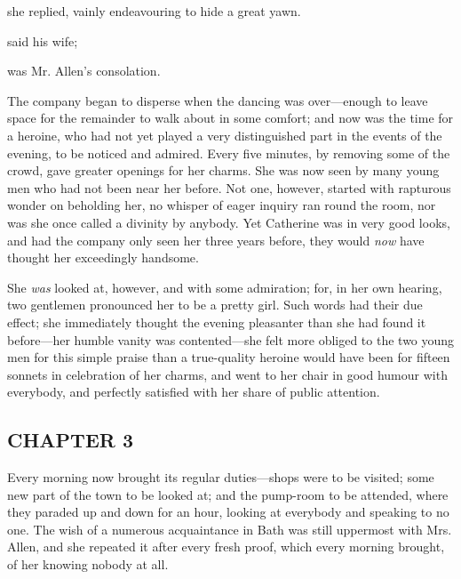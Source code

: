  she replied, vainly endeavouring to hide a great yawn.

 said his wife; 

 was Mr. Allen's consolation.

The company began to disperse when the dancing was over---enough to leave space for the remainder to walk about in some comfort; and now was the time for a heroine, who had not yet played a very distinguished part in the events of the evening, to be noticed and admired. Every five minutes, by removing some of the crowd, gave greater openings for her charms. She was now seen by many young men who had not been near her before. Not one, however, started with rapturous wonder on beholding her, no whisper of eager inquiry ran round the room, nor was she once called a divinity by anybody. Yet Catherine was in very good looks, and had the company only seen her three years before, they would {\em now} have thought her exceedingly handsome.

She {\em was} looked at, however, and with some admiration; for, in her own hearing, two gentlemen pronounced her to be a pretty girl. Such words had their due effect; she immediately thought the evening pleasanter than she had found it before---her humble vanity was contented---she felt more obliged to the two young men for this simple praise than a true-quality heroine would have been for fifteen sonnets in celebration of her charms, and went to her chair in good humour with everybody, and perfectly satisfied with her share of public attention.

\subsection[chapter-3]{\useURL[url4][][][]\from[url4]CHAPTER 3}

Every morning now brought its regular duties---shops were to be visited; some new part of the town to be looked at; and the pump-room to be attended, where they paraded up and down for an hour, looking at everybody and speaking to no one. The wish of a numerous acquaintance in Bath was still uppermost with Mrs. Allen, and she repeated it after every fresh proof, which every morning brought, of her knowing nobody at all.

